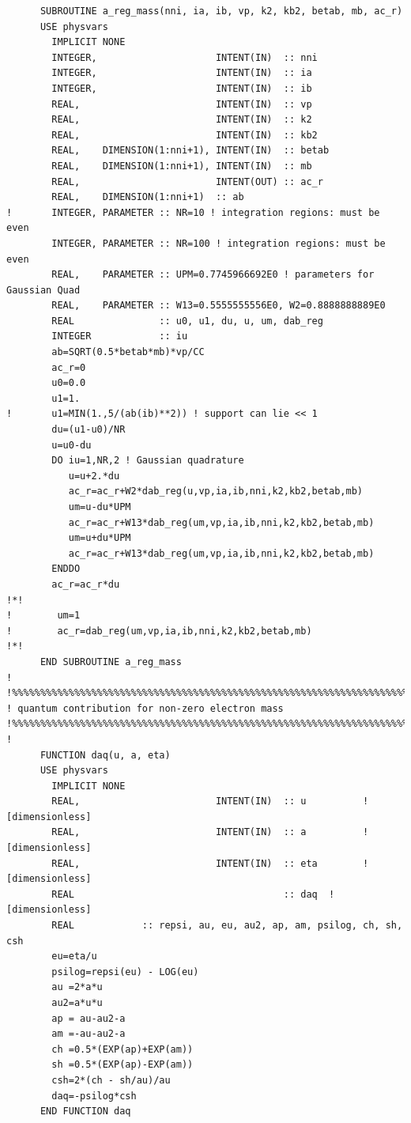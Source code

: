 \documentclass[preprint,12pt,eqsecnum,nofootinbib,amsmath,amssymb]{revtex4}
\begin{document}
{\begin{verbatim}
      SUBROUTINE a_reg_mass(nni, ia, ib, vp, k2, kb2, betab, mb, ac_r)
      USE physvars
        IMPLICIT NONE
        INTEGER,                     INTENT(IN)  :: nni 
        INTEGER,                     INTENT(IN)  :: ia
        INTEGER,                     INTENT(IN)  :: ib
        REAL,                        INTENT(IN)  :: vp
        REAL,                        INTENT(IN)  :: k2
        REAL,                        INTENT(IN)  :: kb2
        REAL,    DIMENSION(1:nni+1), INTENT(IN)  :: betab
        REAL,    DIMENSION(1:nni+1), INTENT(IN)  :: mb
        REAL,                        INTENT(OUT) :: ac_r
        REAL,    DIMENSION(1:nni+1)  :: ab
!       INTEGER, PARAMETER :: NR=10 ! integration regions: must be even
        INTEGER, PARAMETER :: NR=100 ! integration regions: must be even
        REAL,    PARAMETER :: UPM=0.7745966692E0 ! parameters for Gaussian Quad
        REAL,    PARAMETER :: W13=0.5555555556E0, W2=0.8888888889E0
        REAL               :: u0, u1, du, u, um, dab_reg
        INTEGER            :: iu
        ab=SQRT(0.5*betab*mb)*vp/CC
        ac_r=0
        u0=0.0
        u1=1.
!       u1=MIN(1.,5/(ab(ib)**2)) ! support can lie << 1
        du=(u1-u0)/NR
        u=u0-du
        DO iu=1,NR,2 ! Gaussian quadrature
           u=u+2.*du
           ac_r=ac_r+W2*dab_reg(u,vp,ia,ib,nni,k2,kb2,betab,mb)
           um=u-du*UPM
           ac_r=ac_r+W13*dab_reg(um,vp,ia,ib,nni,k2,kb2,betab,mb)
           um=u+du*UPM
           ac_r=ac_r+W13*dab_reg(um,vp,ia,ib,nni,k2,kb2,betab,mb)
        ENDDO
        ac_r=ac_r*du
!*!
!        um=1
!        ac_r=dab_reg(um,vp,ia,ib,nni,k2,kb2,betab,mb)
!*!
      END SUBROUTINE a_reg_mass
!
!%%%%%%%%%%%%%%%%%%%%%%%%%%%%%%%%%%%%%%%%%%%%%%%%%%%%%%%%%%%%%%%%%%%%%%%
! quantum contribution for non-zero electron mass
!%%%%%%%%%%%%%%%%%%%%%%%%%%%%%%%%%%%%%%%%%%%%%%%%%%%%%%%%%%%%%%%%%%%%%%%
!
      FUNCTION daq(u, a, eta)
      USE physvars
        IMPLICIT NONE
        REAL,                        INTENT(IN)  :: u          ! [dimensionless]
        REAL,                        INTENT(IN)  :: a          ! [dimensionless]
        REAL,                        INTENT(IN)  :: eta        ! [dimensionless]
        REAL                                     :: daq  ! [dimensionless]
        REAL            :: repsi, au, eu, au2, ap, am, psilog, ch, sh, csh
        eu=eta/u 
        psilog=repsi(eu) - LOG(eu)
        au =2*a*u
        au2=a*u*u
        ap = au-au2-a
        am =-au-au2-a
        ch =0.5*(EXP(ap)+EXP(am))
        sh =0.5*(EXP(ap)-EXP(am))
        csh=2*(ch - sh/au)/au
        daq=-psilog*csh
      END FUNCTION daq


\end{verbatim}}
\end{document}
